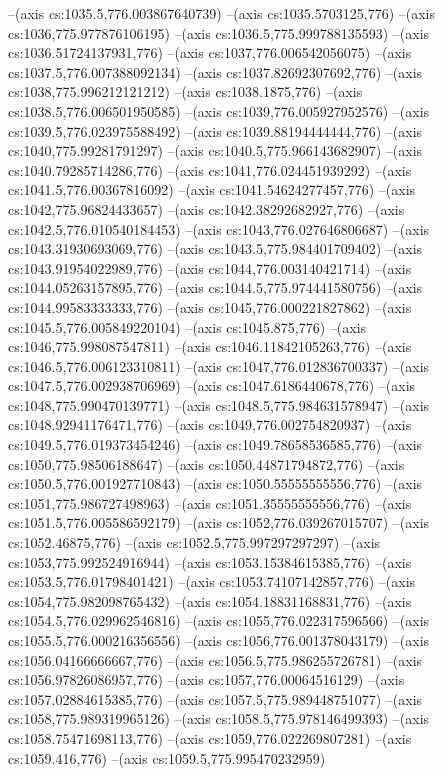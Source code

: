 --(axis cs:1035.5,776.003867640739)
--(axis cs:1035.5703125,776)
--(axis cs:1036,775.977876106195)
--(axis cs:1036.5,775.999788135593)
--(axis cs:1036.51724137931,776)
--(axis cs:1037,776.006542056075)
--(axis cs:1037.5,776.007388092134)
--(axis cs:1037.82692307692,776)
--(axis cs:1038,775.996212121212)
--(axis cs:1038.1875,776)
--(axis cs:1038.5,776.006501950585)
--(axis cs:1039,776.005927952576)
--(axis cs:1039.5,776.023975588492)
--(axis cs:1039.88194444444,776)
--(axis cs:1040,775.99281791297)
--(axis cs:1040.5,775.966143682907)
--(axis cs:1040.79285714286,776)
--(axis cs:1041,776.024451939292)
--(axis cs:1041.5,776.00367816092)
--(axis cs:1041.54624277457,776)
--(axis cs:1042,775.96824433657)
--(axis cs:1042.38292682927,776)
--(axis cs:1042.5,776.010540184453)
--(axis cs:1043,776.027646806687)
--(axis cs:1043.31930693069,776)
--(axis cs:1043.5,775.984401709402)
--(axis cs:1043.91954022989,776)
--(axis cs:1044,776.003140421714)
--(axis cs:1044.05263157895,776)
--(axis cs:1044.5,775.974441580756)
--(axis cs:1044.99583333333,776)
--(axis cs:1045,776.000221827862)
--(axis cs:1045.5,776.005849220104)
--(axis cs:1045.875,776)
--(axis cs:1046,775.998087547811)
--(axis cs:1046.11842105263,776)
--(axis cs:1046.5,776.006123310811)
--(axis cs:1047,776.012836700337)
--(axis cs:1047.5,776.002938706969)
--(axis cs:1047.6186440678,776)
--(axis cs:1048,775.990470139771)
--(axis cs:1048.5,775.984631578947)
--(axis cs:1048.92941176471,776)
--(axis cs:1049,776.002754820937)
--(axis cs:1049.5,776.019373454246)
--(axis cs:1049.78658536585,776)
--(axis cs:1050,775.98506188647)
--(axis cs:1050.44871794872,776)
--(axis cs:1050.5,776.001927710843)
--(axis cs:1050.55555555556,776)
--(axis cs:1051,775.986727498963)
--(axis cs:1051.35555555556,776)
--(axis cs:1051.5,776.005586592179)
--(axis cs:1052,776.039267015707)
--(axis cs:1052.46875,776)
--(axis cs:1052.5,775.997297297297)
--(axis cs:1053,775.992524916944)
--(axis cs:1053.15384615385,776)
--(axis cs:1053.5,776.01798401421)
--(axis cs:1053.74107142857,776)
--(axis cs:1054,775.982098765432)
--(axis cs:1054.18831168831,776)
--(axis cs:1054.5,776.029962546816)
--(axis cs:1055,776.022317596566)
--(axis cs:1055.5,776.000216356556)
--(axis cs:1056,776.001378043179)
--(axis cs:1056.04166666667,776)
--(axis cs:1056.5,775.986255726781)
--(axis cs:1056.97826086957,776)
--(axis cs:1057,776.00064516129)
--(axis cs:1057.02884615385,776)
--(axis cs:1057.5,775.989448751077)
--(axis cs:1058,775.989319965126)
--(axis cs:1058.5,775.978146499393)
--(axis cs:1058.75471698113,776)
--(axis cs:1059,776.022269807281)
--(axis cs:1059.416,776)
--(axis cs:1059.5,775.995470232959)
